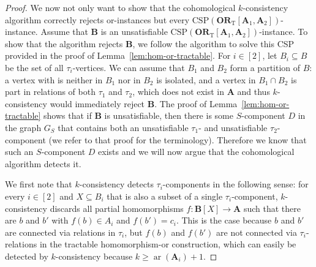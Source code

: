\documentclass[a4paper,english, thm-restate]{lipics-v2021}
\newcommand{\sig}{\tau}
\newcommand{\arity}[1]{\operatorname*{ar}(#1)}
\newcommand{\StructA}{\mathbf{A}}
\newcommand{\StructB}{\mathbf{B}}
\newcommand{\CSP}[1]{\mathrm{CSP}(#1)}
\newcommand{\ORT}[1]{\mathbf{OR}_\text{T}[#1]}
\begin{document}
\begin{proof}
		
		We now not only want to show that the cohomological $k$-consistency algorithm correctly rejects or-instances but every $\CSP{\ORT{\StructA_1,\StructA_2}}$-instance.
		Assume that $\StructB$ is an unsatisfiable $\CSP{\ORT{\StructA_1,\StructA_2}}$-instance.
		To show that the algorithm rejects $\StructB$, we follow the algorithm to solve this CSP provided in the proof of Lemma~\ref{lem:hom-or-tractable}.
		For $i\in[2]$, let $B_i\subseteq B$ be the set of all $\sig_i$-vertices.
		We can assume that $B_1$ and $B_2$ form a partition of $B$:
		a vertex with is neither in $B_1$ nor in $B_2$ is isolated,
		and a vertex in $B_1\cap B_2$ is part in relations of both $\sig_1$ and $\sig_2$,
		which does not exist in $\StructA$ and thus $k$-consistency would immediately reject $\StructB$.
		The proof of Lemma~\ref{lem:hom-or-tractable} shows that if $\StructB$ is unsatisfiable, then there is some $S$-component $D$ in the graph $G_S$ that contains both an unsatisfiable $\tau_1$- and unsatisfiable $\tau_2$-component (we refer to that proof for the terminology). Therefore we know that such an $S$-component $D$ exists and we will now argue that the cohomological algorithm detects it.
		
		
		
		We first note that $k$-consistency detects $\sig_i$-components in the following sense: for every $i\in[2]$ and  $X\subseteq B_i$ that is also a subset of a single $\sig_i$-component,
		$k$-consistency discards all partial homomorphisms $f\colon \StructB[X] \to \StructA$ such that there are $b$ and $b'$
		with $f(b) \in A_i$ and $f(b') = c_i$.
		This is the case because $b$ and $b'$ are connected via relations in $\sig_i$,
		but $f(b)$ and $f(b')$ are not connected via $\sig_i$-relations in the tractable homomorphism-or construction,
		which can easily be detected by $k$-consistency because $k \geq \arity{\StructA_i} + 1$.
		

\end{proof}
\end{document}
